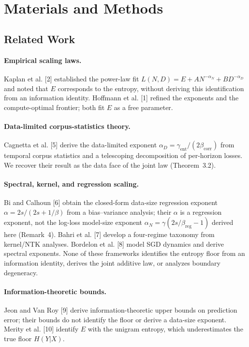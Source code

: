 \documentclass[entropy,article,submit,moreauthors,pdftex]{mdpi}
\begin{document}
\section{Materials and Methods}
\label{sec:methods}

\subsection{Related Work}
\label{sec:related}

\paragraph{Empirical scaling laws.}
Kaplan et al. [2] established the power-law fit
$L(N,D)=E+AN^{-\alpha_N}+BD^{-\alpha_D}$ and noted that $E$ corresponds to
the entropy, without deriving this identification from an information identity.
Hoffmann et al. [1] refined the exponents and the compute-optimal frontier;
both fit $E$ as a free parameter.

\paragraph{Data-limited corpus-statistics theory.}
Cagnetta et al. [5] derive the data-limited exponent
$\alpha_D=\gamma_{\mathrm{ent}}/(2\beta_{\mathrm{corr}})$ from temporal corpus statistics
and a telescoping decomposition of per-horizon losses. We recover their result
as the data face of the joint law (Theorem~3.2).

\paragraph{Spectral, kernel, and regression scaling.}
Bi and Calhoun [6] obtain the closed-form data-size regression exponent
$\alpha=2s/(2s+1/\beta)$ from a bias--variance analysis; their $\alpha$ is a
regression exponent, not the log-loss model-size exponent
$\alpha_N=\gamma(2s/\beta_{\mathrm{reg}}-1)$ derived here
(Remark~4). Bahri et al. [7] develop a four-regime taxonomy
from kernel/NTK analyses. Bordelon et al. [8] model SGD dynamics and
derive spectral exponents. None of these frameworks identifies the entropy
floor from an information identity, derives the joint additive law, or
analyzes boundary degeneracy.

\paragraph{Information-theoretic bounds.}
Jeon and Van Roy [9] derive information-theoretic upper bounds on prediction
error; their bounds do not identify the floor or derive a data-size exponent.
Merity et al. [10] identify $E$ with the unigram entropy,
which underestimates the true floor $H(Y|X)$.
\end{document}
